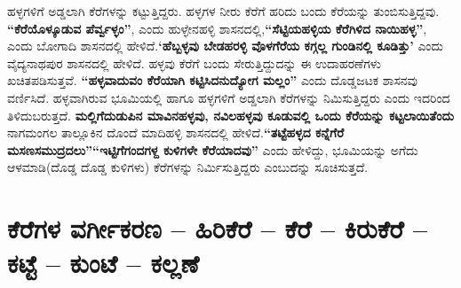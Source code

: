 ಹಳ್ಳಗಳಿಗೆ ಅಡ್ಡಲಾಗಿ ಕೆರೆಗಳನ್ನು ಕಟ್ಟುತ್ತಿದ್ದರು. ಹಳ್ಳಗಳ ನೀರು ಕೆರೆಗೆ ಹರಿದು ಬಂದು ಕೆರೆಯನ್ನು ತುಂಬಿಸುತ್ತಿದ್ದವು. \textbf{“ಕೆರೆಯೊಳ್ಕೂಡುವ ಪೆರ್ವ್ವಳ್ಳಂ”}, ಎಂದು ಹುಳ್ಳೇನಹಳ್ಳಿ ಶಾಸನದಲ್ಲಿ,\textbf{“ಸೆಟ್ಟಿಯಹಳ್ಳಿಯ ಕೆರೆಗಿಳಿದ ನಾಯಿಹಳ್ಳ”}, ಎಂದು ಬೋಗಾದಿ ಶಾಸನದಲ್ಲಿ ಹೇಳಿದೆ.\textbf{‘ಹೆಬ್ಬಳ್ಳವು ಬೇಡಹರಳ್ಳಿ ವೊಳಗೆರೆಯ ಕಗ್ಗಲ್ಲ ಗುಂಡಿನಲ್ಲಿ ಕೂಡಿತ್ತು’} ಎಂದು ವೈದ್ಯನಾಥಪುರ ಶಾಸನದಲ್ಲಿ ಹೇಳಿದೆ. ಹಳ್ಳವು ಕೆರೆಗೆ ಬಂದು ಸೇರುತ್ತಿದ್ದುದನ್ನು ಈ ಉದಾಹರಣೆಗಳು ಖಚಿತಪಡಿಸುತ್ತವೆ. \textbf{“ಹಳ್ಳವಾದುವಂ ಕೆರೆಯಾಗಿ ಕಟ್ಟಿಸಿದನುದ್ಯೋಗ ಮಲ್ಲಂ”} ಎಂದು ದೊಡ್ಡಜಟಕ ಶಾಸನವು ವರ್ಣಿಸಿದೆ. ಹಳ್ಳವಾಗಿರುವ ಭೂಮಿಯಲ್ಲಿ ಹಾಗೂ ಹಳ್ಳಗಳಿಗೆ ಅಡ್ಡಲಾಗಿ ಕೆರೆಗಳನ್ನು ನಿಮಿಸುತ್ತಿದ್ದರು ಎಂದು ಇದರಿಂದ ತಿಳಿದುಬರುತ್ತದೆ. \textbf{ಮಲ್ಲಿಗೆದುಡುಪಿನ ಮಾವಿನಹಳ್ಳವು, ನವಿಲಹಳ್ಳವು ಕೂಡುವಲ್ಲಿ ಒಂದು ಕೆರೆಯನ್ನು ಕಟ್ಟಲಾಯಿತೆಂದು} ನಾಗಮಂಗಲ ತಾಲ್ಲೂಕಿನ ದೊಂದೆ ಮಾದಿಹಳ್ಳಿ ಶಾಸನದಲ್ಲಿ ಹೇಳಿದೆ.\textbf{“ತಟ್ಟೆಹಳ್ಳದ ಕನ್ನೆಗೆರೆ ಮಸಣಸಮುದ್ರದಲು”}\textbf{“ಇಟ್ಟಿಗೆಗಂದಗಳ್ದ ಕುಳಿಗಳೇ ಕೆರೆಯಾದವು”} ಎಂದು ಹೇಳಿದ್ದು, ಭೂಮಿಯನ್ನು ಅಗೆದು ಆಳಮಾಡಿ(ದೊಡ್ಡ ದೊಡ್ಡ ಕುಳಿಗಳು) ಕೆರೆಗಳನ್ನು ನಿರ್ಮಿಸುತ್ತಿದ್ದರು ಎಂಬುದನ್ನು ಸೂಚಿಸುತ್ತದೆ.


\section{ಕೆರೆಗಳ ವರ್ಗೀಕರಣ – ಹಿರಿಕೆರೆ – ಕೆರೆ – ಕಿರುಕೆರೆ – ಕಟ್ಟೆ – ಕುಂಟೆ – ಕಲ್ಲಣೆ}

